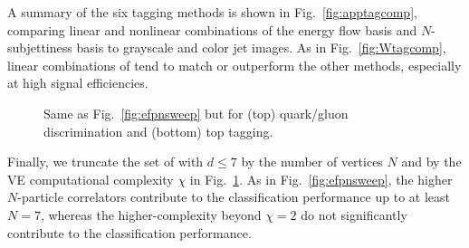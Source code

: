 \documentclass[letterpaper,11pt]{article}
\DeclareRobustCommand{\Fig}[1]{Fig.~\ref{#1}}
\newcommand{\B}{\text{EFP}\xspace}
\newcommand{\Bs}{\text{EFPs}\xspace}
\begin{document}
A summary of the six tagging methods is shown in \Fig{fig:apptagcomp}, comparing linear and nonlinear combinations of the energy flow basis and $N$-subjettiness basis to grayscale and color jet images. 
%
As in \Fig{fig:Wtagcomp}, linear combinations of \B tend to match or outperform the other methods, especially at high signal efficiencies.

\begin{figure}[t]
\centering
{}

\caption{Same as \Fig{fig:efpnsweep} but for (top) quark/gluon discrimination and (bottom) top tagging.}
\label{fig:appnchisweep}
\end{figure}
\afterpage{\clearpage}

Finally, we truncate the set of \Bs with $d\le 7$ by the number of vertices $N$ and by the VE computational complexity $\chi$ in \Fig{fig:appnchisweep}.  
%
As in \Fig{fig:efpnsweep}, the higher $N$-particle correlators contribute to the classification performance up to at least $N=7$, whereas the higher-complexity \Bs beyond $\chi = 2$ do not significantly contribute to the classification performance.

\newpage


\end{document}
